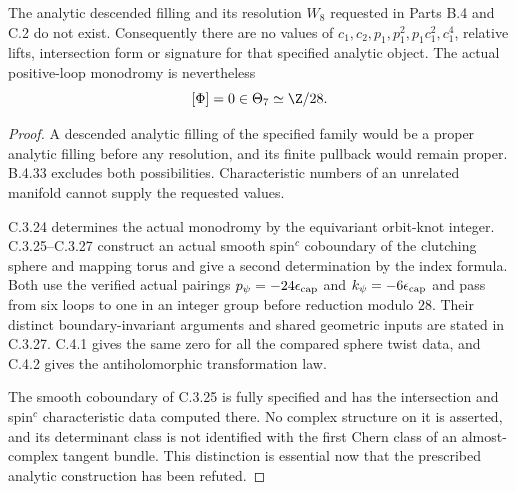 \begin{corollary}
The analytic descended filling and its resolution $W_8$
requested in Parts B.4 and C.2 do not exist. Consequently
there are no values of $c_1,c_2,p_1,p_1^2,p_1c_1^2,c_1^4$,
relative lifts, intersection form or signature for that
specified analytic object. The actual positive-loop
monodromy is nevertheless
\[
                    [\Phi]=0\in\Theta_7\simeq\Z/28.
\]
\end{corollary}
\begin{proof}
A descended analytic filling of the specified family
would be a proper analytic filling before any resolution,
and its finite pullback would remain proper. B.4.33
excludes both possibilities. Characteristic numbers of
an unrelated manifold cannot supply the requested values.

C.3.24 determines the actual monodromy by the equivariant
orbit-knot integer. C.3.25--C.3.27 construct an actual
smooth spin$^c$ coboundary of the clutching sphere and
mapping torus and give a second determination by the
index formula. Both use the verified actual pairings
$p_\psi=-24\epsilon_{\rm cap}$ and
$k_\psi=-6\epsilon_{\rm cap}$ and pass from six loops
to one in an integer group before reduction modulo $28$.
Their distinct boundary-invariant arguments and shared
geometric inputs are stated in C.3.27. C.4.1 gives the
same zero for all the compared sphere twist data, and
C.4.2 gives the antiholomorphic transformation law.

The smooth coboundary of C.3.25 is fully specified and
has the intersection and spin$^c$ characteristic data
computed there. No complex structure on it is asserted,
and its determinant class is not identified with the first
Chern class of an almost-complex tangent bundle. This
distinction is essential now that the prescribed analytic
construction has been refuted.
\end{proof}

